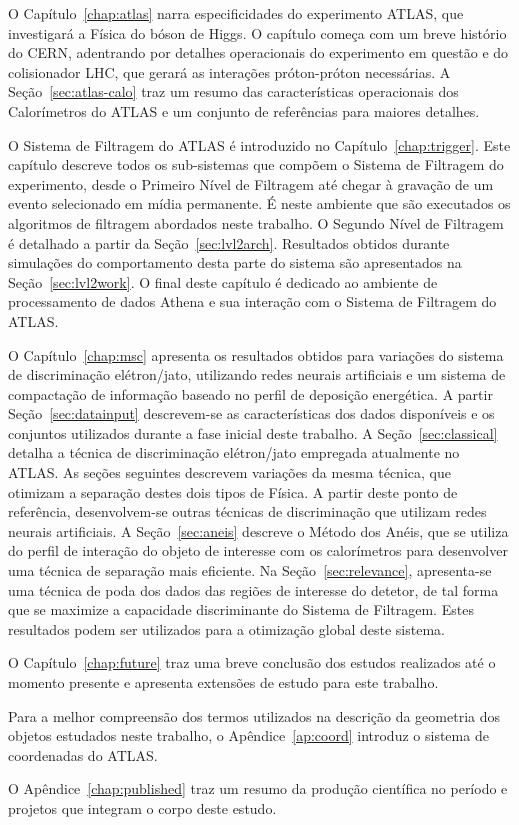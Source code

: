 O Capítulo~\ref{chap:atlas} narra especificidades do experimento ATLAS, que
investigará a Física do bóson de Higgs. O capítulo começa com um breve
histório do CERN, adentrando por detalhes operacionais do experimento em
questão e do colisionador LHC, que gerará as interações próton-próton
necessárias. A Seção~\ref{sec:atlas-calo} traz um resumo das características
operacionais dos Calorímetros do ATLAS e um conjunto de referências para
maiores detalhes.

O Sistema de Filtragem do ATLAS é introduzido no
Capítulo~\ref{chap:trigger}. Este capítulo descreve todos os sub-sistemas que
compõem o Sistema de Filtragem do experimento, desde o Primeiro Nível de
Filtragem até chegar à gravação de um evento selecionado em mídia
permanente. É neste ambiente que são executados os algoritmos de filtragem
abordados neste trabalho. O Segundo Nível de Filtragem é detalhado a partir da
Seção~\ref{sec:lvl2arch}. Resultados obtidos durante simulações do
comportamento desta parte do sistema são apresentados na
Seção~\ref{sec:lvl2work}. O final deste capítulo é dedicado ao ambiente de
processamento de dados Athena e sua interação com o Sistema de Filtragem do
ATLAS.

O Capítulo~\ref{chap:msc} apresenta os resultados obtidos para variações do
sistema de discriminação elétron/jato, utilizando redes neurais artificiais e
um sistema de compactação de informação baseado no perfil de deposição
energética. A partir Seção~\ref{sec:datainput} descrevem-se as características
dos dados disponíveis e os conjuntos utilizados durante a fase inicial deste
trabalho. A Seção~\ref{sec:classical} detalha a técnica de discriminação
elétron/jato empregada atualmente no ATLAS. As seções seguintes descrevem
variações da mesma técnica, que otimizam a separação destes dois tipos de
Física. A partir deste ponto de referência, desenvolvem-se outras técnicas de
discriminação que utilizam redes neurais artificiais. A Seção~\ref{sec:aneis}
descreve o Método dos Anéis, que se utiliza do perfil de interação do objeto
de interesse com os calorímetros para desenvolver uma técnica de separação
mais eficiente. Na Seção~\ref{sec:relevance}, apresenta-se uma técnica de poda
dos dados das regiões de interesse do detetor, de tal forma que se maximize a
capacidade discriminante do Sistema de Filtragem. Estes resultados podem ser
utilizados para a otimização global deste sistema.

O Capítulo~\ref{chap:future} traz uma breve conclusão dos estudos realizados
até o momento presente e apresenta extensões de estudo para este trabalho.

Para a melhor compreensão dos termos utilizados na descrição da geometria dos
objetos estudados neste trabalho, o Apêndice~\ref{ap:coord} introduz o sistema
de coordenadas do ATLAS.

O Apêndice~\ref{chap:published} traz um resumo da produção científica no
período e projetos que integram o corpo deste estudo.

